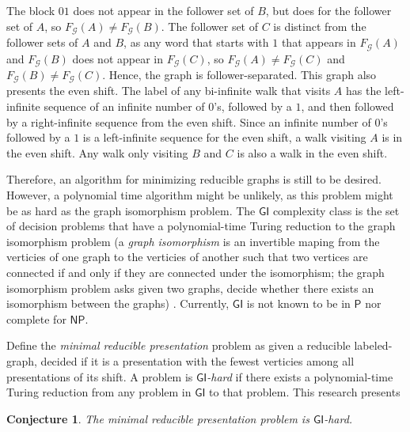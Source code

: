 \documentclass{article}
\newcommand{\Gc}{\mathcal{G}}  %
\newcommand{\term}[1]{\textit{#1}}
\newtheorem*{conjecture}{Conjecture}
\begin{document}
The block \(01\) does not appear in the follower set of \(B\), but does for the follower 
set of \(A\), so \(F_\Gc(A) \ne F_\Gc(B)\). The follower set of \(C\) is distinct from
the follower sets of \(A\) and \(B\), as any word that starts with \(1\) that appears in 
\(F_\Gc(A)\) and \(F_\Gc(B)\) does not appear in \(F_\Gc(C)\), so \(F_\Gc(A) \ne F_\Gc(C)\) and 
\(F_\Gc(B) \ne F_\Gc(C)\). Hence, the graph is follower-separated. This graph also presents 
the even shift. The label of any bi-infinite walk that visits \(A\) has the left-infinite 
sequence of an infinite number of \(0\)'s, followed by a \(1\), and then followed by a 
right-infinite sequence from the even shift. Since an infinite number of \(0\)'s followed by 
a \(1\) is a left-infinite sequence for the even shift, a walk visiting \(A\) is in the 
even shift. Any walk only visiting \(B\) and \(C\) is also a walk in the even shift. 

Therefore, an algorithm for minimizing reducible graphs is still to be desired. However, 
a polynomial time algorithm might be unlikely, as this problem might be as hard as 
the graph isomorphism problem. The \(\mathsf{GI}\) complexity class is the set of decision 
problems that have a polynomial-time Turing reduction to the graph isomorphism problem (a 
\term{graph isomorphism} is an invertible maping from the verticies of one graph 
to the verticies of another such that two vertices are connected if and only if they 
are connected under the isomorphism; the graph isomorphism problem asks given two 
graphs, decide whether there exists an isomorphism between the graphs) \cite{kobler2012graph}.
Currently, \(\mathsf{GI}\) is not known to be in \(\mathsf{P}\) nor complete for \(\mathsf{NP}\).

Define the \term{minimal reducible presentation} problem as given a reducible labeled-graph,
decided if it is a presentation with the fewest verticies among all presentations of its shift. 
A problem is \term{\(\mathsf{GI}\)-hard} if there exists a polynomial-time Turing reduction from 
any problem in \(\mathsf{GI}\) to that problem. This research presents

\begin{conjecture}
    The minimal reducible presentation problem is \(\mathsf{GI}\)-hard.
\end{conjecture}



\printbibliography
\end{document}
